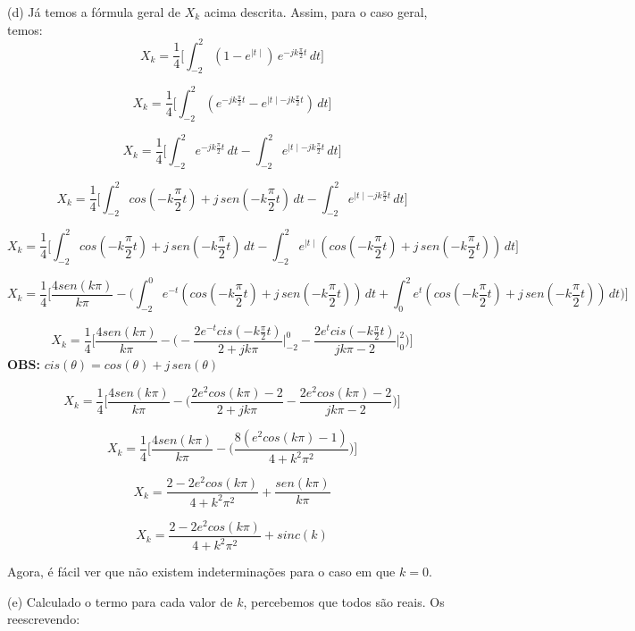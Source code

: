 \documentclass{article}
\begin{document}
\vspace{\baselineskip}

(d) Já temos a fórmula geral de $X_{k}$ acima descrita. Assim, para o caso geral, temos:
\[X_{k} = \frac{1}{4}\biggl[\int_{-2}^{2} (1 - e^{\mid t \mid})\,e^{-jk\frac{\pi}{2}t}\,dt\biggr]\]

\[X_{k} = \frac{1}{4}\biggl[\int_{-2}^{2} (e^{-jk\frac{\pi}{2}t} - e^{\mid t \mid - jk\frac{\pi}{2}t})\,dt\biggr]\]

\[X_{k} = \frac{1}{4}\biggl[\int_{-2}^{2} e^{-jk\frac{\pi}{2}t}\,dt - \int_{-2}^{2} e^{\mid t \mid - jk\frac{\pi}{2}t}\,dt\biggr]\]

\[X_{k} = \frac{1}{4}\biggl[\int_{-2}^{2} cos(-k\frac{\pi}{2}t) + j\,sen(-k\frac{\pi}{2}t)\,dt - \int_{-2}^{2} e^{\mid t \mid - jk\frac{\pi}{2}t}\,dt\biggr]\]

\[X_{k} = \frac{1}{4}\biggl[\int_{-2}^{2} cos(-k\frac{\pi}{2}t) + j\,sen(-k\frac{\pi}{2}t)\,dt - \int_{-2}^{2} e^{\mid t \mid}(cos(-k\frac{\pi}{2}t) + j\,sen(-k\frac{\pi}{2}t))\,dt\biggr]\]

\[X_{k} = \frac{1}{4}\biggl[\frac{4sen(k\pi)}{k\pi} - \biggl(\int_{-2}^{0} e^{-t}(cos(-k\frac{\pi}{2}t) + j\,sen(-k\frac{\pi}{2}t))\,dt + \int_{0}^{2} e^{t}(cos(-k\frac{\pi}{2}t) + j\,sen(-k\frac{\pi}{2}t))\,dt \biggr)\biggr]\]

\[X_{k} = \frac{1}{4}\biggl[\frac{4sen(k\pi)}{k\pi} - 
\biggl(
    -\frac{2e^{-t}cis(-k\frac{\pi}{2}t)}{2 + jk\pi}\bigg|_{-2}^{0} - 
    \frac{2e^{t}cis(-k\frac{\pi}{2}t)}{jk\pi - 2}\bigg|_{0}^{2}
\biggr)\biggr]\] \textbf{OBS:} $cis(\theta) = cos(\theta) + j\,sen(\theta)$

\[X_{k} = \frac{1}{4}\biggl[\frac{4sen(k\pi)}{k\pi} - 
\biggl(
    \frac{2e^{2}cos(k\pi) - 2}{2 + jk\pi} - 
    \frac{2e^{2}cos(k\pi) - 2}{jk\pi - 2}
\biggr)\biggr]\]

\[X_{k} = \frac{1}{4}\biggl[\frac{4sen(k\pi)}{k\pi} - 
\biggl(
    \frac{8(e^{2}cos(k\pi) - 1)}{4 + k^2\pi^2}
\biggr)\biggr]\]

\[X_{k} = \frac{2 - 2e^2cos(k\pi)}{4 + k^2\pi^2} + \frac{sen(k\pi)}{k\pi}\]

\[X_{k} = \frac{2 - 2e^2cos(k\pi)}{4 + k^2\pi^2} + sinc(k)\]

Agora, é fácil ver que não existem indeterminações para o caso em que $k = 0$.

\vspace{\baselineskip}

(e) Calculado o termo para cada valor de $k$, percebemos que todos são reais. Os reescrevendo:
\end{document}
